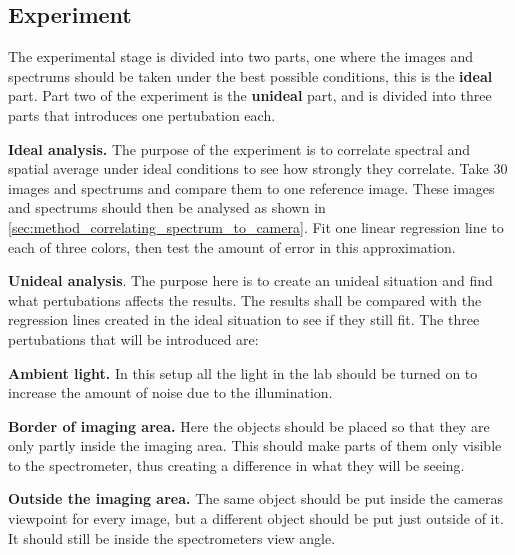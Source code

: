 \subsection{Experiment}
\label{sec:experiment}

The experimental stage is divided into two parts, one where the images and spectrums should be taken under the best possible conditions, this is the \textbf{ideal} part. Part two of the experiment is the \textbf{unideal} part, and is divided into three parts that introduces one pertubation each.

\textbf{Ideal analysis.} The purpose of the experiment is to correlate spectral and spatial average under ideal conditions to see how strongly they correlate. Take 30 images and spectrums and compare them to one reference image. These images and spectrums should then be analysed as shown in \ref{sec:method_correlating_spectrum_to_camera}. Fit one linear regression line to each of three colors, then test the amount of error in this approximation. 

\textbf{Unideal analysis}. The purpose here is to create an unideal situation and find what pertubations affects the results. The results shall be compared with the regression lines created in the ideal situation to see if they still fit. The three pertubations that will be introduced are:

\textbf{Ambient light.} In this setup all the light in the lab should be turned on to increase the amount of noise due to the illumination.

\textbf{Border of imaging area.} Here the objects should be placed so that they are only partly inside the imaging area. This should make parts of them only visible to the spectrometer, thus creating a difference in what they will be seeing. 

\textbf{Outside the imaging area.} The same object should be put inside the cameras viewpoint for every image, but a different object should be put just outside of it. It should still be inside the spectrometers view angle.
